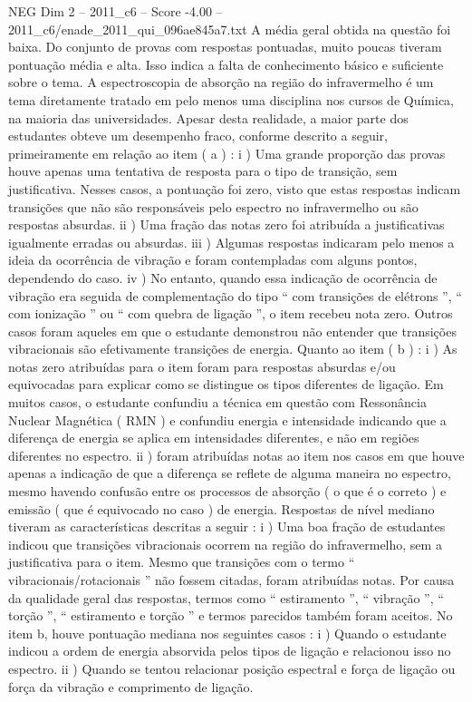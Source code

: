 \begin{textsample}{NEG Dim 2 – 2011\_c6 – Score -4.00 – 2011\_c6/enade\_2011\_qui\_096ae845a7.txt}
A média geral obtida na questão foi baixa.
Do conjunto de provas com respostas pontuadas, muito poucas tiveram pontuação média e alta.
Isso indica a falta de conhecimento básico e suficiente sobre o tema.
A espectroscopia de absorção na região do infravermelho é um tema diretamente tratado em pelo menos uma disciplina nos cursos de Química, na maioria das universidades.
Apesar desta realidade, a maior parte dos estudantes obteve um desempenho fraco, conforme descrito a seguir, primeiramente em relação ao item ( a ) : i ) Uma grande proporção das provas houve apenas uma tentativa de resposta para o tipo de transição, sem justificativa.
Nesses casos, a pontuação foi zero, visto que estas respostas indicam transições que não são responsáveis pelo espectro no infravermelho ou são respostas absurdas. ii ) Uma fração das notas zero foi atribuída a justificativas igualmente erradas ou absurdas. iii ) Algumas respostas indicaram pelo menos a ideia da ocorrência de vibração e foram contempladas com alguns pontos, dependendo do caso. iv ) No entanto, quando essa indicação de ocorrência de vibração era seguida de complementação do tipo “ com transições de elétrons ”, “ com ionização ” ou “ com quebra de ligação ”, o item recebeu nota zero.
Outros casos foram aqueles em que o estudante demonstrou não entender que transições vibracionais são efetivamente transições de energia.
Quanto ao item ( b ) : i ) As notas zero atribuídas para o item foram para respostas absurdas e/ou equivocadas para explicar como se distingue os tipos diferentes de ligação.
Em muitos casos, o estudante confundiu a técnica em questão com Ressonância Nuclear Magnética ( RMN ) e confundiu energia e intensidade indicando que a diferença de energia se aplica em intensidades diferentes, e não em regiões diferentes no espectro. ii ) foram atribuídas notas ao item nos casos em que houve apenas a indicação de que a diferença se reflete de alguma maneira no espectro, mesmo havendo confusão entre os processos de absorção ( o que é o correto ) e emissão ( que é equivocado no caso ) de energia.
Respostas de nível mediano tiveram as características descritas a seguir : i ) Uma boa fração de estudantes indicou que transições vibracionais ocorrem na região do infravermelho, sem a justificativa para o item.
Mesmo que transições com o termo “ vibracionais/rotacionais ” não fossem citadas, foram atribuídas notas.
Por causa da qualidade geral das respostas, termos como “ estiramento ”, “ vibração ”, “ torção ”, “ estiramento e torção ” e termos parecidos também foram aceitos.
No item b, houve pontuação mediana nos seguintes casos : i ) Quando o estudante indicou a ordem de energia absorvida pelos tipos de ligação e relacionou isso no espectro. ii ) Quando se tentou relacionar posição espectral e força de ligação ou força da vibração e comprimento de ligação.

\end{textsample}
